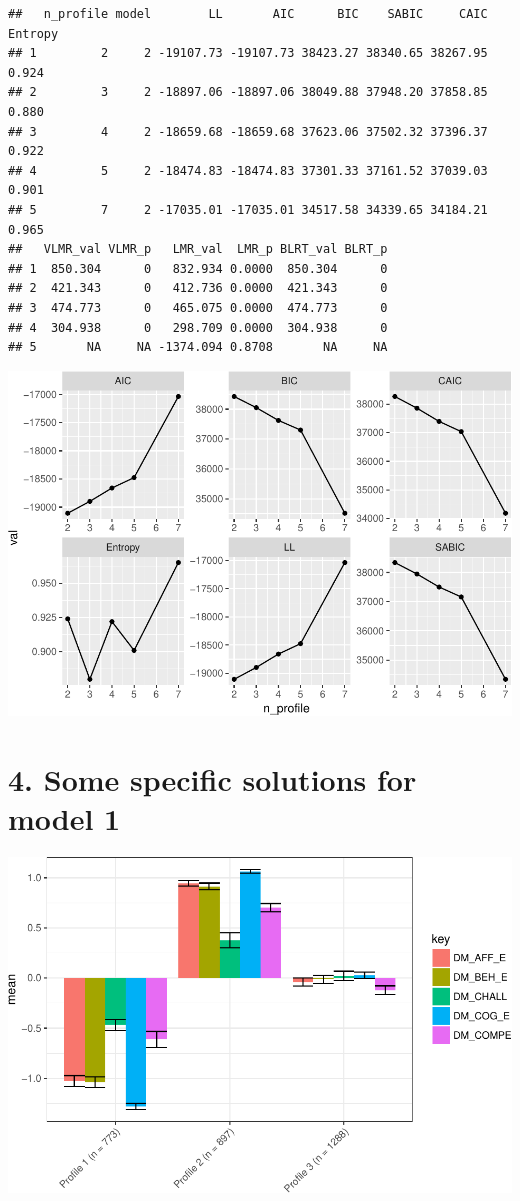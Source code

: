 \documentclass[]{book}
\theoremstyle{definition}
\theoremstyle{definition}
\theoremstyle{definition}
\theoremstyle{remark}
\begin{document}
\begin{verbatim}
##   n_profile model        LL       AIC      BIC    SABIC     CAIC Entropy
## 1         2     2 -19107.73 -19107.73 38423.27 38340.65 38267.95   0.924
## 2         3     2 -18897.06 -18897.06 38049.88 37948.20 37858.85   0.880
## 3         4     2 -18659.68 -18659.68 37623.06 37502.32 37396.37   0.922
## 4         5     2 -18474.83 -18474.83 37301.33 37161.52 37039.03   0.901
## 5         7     2 -17035.01 -17035.01 34517.58 34339.65 34184.21   0.965
##   VLMR_val VLMR_p   LMR_val  LMR_p BLRT_val BLRT_p
## 1  850.304      0   832.934 0.0000  850.304      0
## 2  421.343      0   412.736 0.0000  421.343      0
## 3  474.773      0   465.075 0.0000  474.773      0
## 4  304.938      0   298.709 0.0000  304.938      0
## 5       NA     NA -1374.094 0.8708       NA     NA
\end{verbatim}

\includegraphics{rosenberg-dissertation_files/figure-latex/compare-solutions-model2-1.pdf}

\section{4. Some specific solutions for model
1}\label{some-specific-solutions-for-model-1}

\includegraphics{rosenberg-dissertation_files/figure-latex/spec-solutions-model1-1.pdf}
\end{document}
